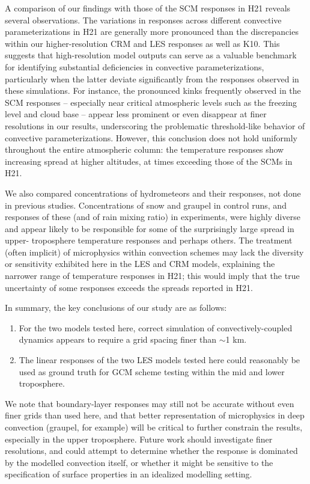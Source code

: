 \documentclass[draft]{agujournal2019}
\begin{document}
A comparison of our findings with those of the SCM responses in H21 reveals
several observations. The variations in responses across different convective
parameterizations in H21 are generally more pronounced than the discrepancies
within our higher-resolution CRM and LES responses as well as K10. This suggests
that high-resolution model outputs can serve as a valuable benchmark for
identifying substantial deficiencies in convective parameterizations,
particularly when the latter deviate significantly from the responses observed
in these simulations. For instance, the pronounced kinks frequently observed in
the SCM responses -- especially near critical atmospheric levels such as the
freezing level and cloud base -- appear less prominent or even disappear at
finer resolutions in our results, underscoring the problematic threshold-like
behavior of convective parameterizations. However, this conclusion does not hold
uniformly throughout the entire atmospheric column: the temperature responses
show increasing spread at higher altitudes, at times exceeding those of the SCMs
in H21. 

We also compared concentrations of hydrometeors and their responses, not done in
previous studies. Concentrations of snow and graupel in control runs, and
responses of these (and of rain mixing ratio) in experiments, were highly
diverse and appear likely to be responsible for some of the surprisingly large
spread in upper- troposphere temperature responses and perhaps others. The
treatment (often implicit) of microphysics within convection schemes may lack
the diversity or sensitivity exhibited here in the LES and CRM models,
explaining the narrower range of temperature responses in H21; this would imply
that the true uncertainty of some responses exceeds the spreads reported in H21.

In summary, the key conclusions of our study are as follows:

\begin{enumerate}
    \item For the two models tested here, correct simulation of
    convectively-coupled dynamics appears to require a grid spacing finer than
    $\sim$1 km.
    \item The linear responses of the two LES models tested here could
    reasonably be used as ground truth for GCM scheme testing within the mid and
    lower troposphere.
\end{enumerate}

We note that boundary-layer responses may still not be accurate without even
finer grids than used here, and that better representation of microphysics in
deep convection (graupel, for example) will be critical to further constrain the
results, especially in the upper troposphere. Future work should investigate
finer resolutions, and could attempt to determine whether the response is
dominated by the modelled convection itself, or whether it might be sensitive to
the specification of surface properties in an idealized modelling setting.
\end{document}
